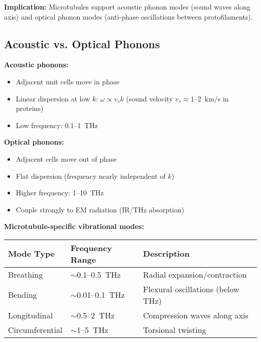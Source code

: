 \textbf{Implication:} Microtubules support acoustic phonon modes (sound waves along axis) and optical phonon modes (anti-phase oscillations between protofilaments).

\subsection{Acoustic vs. Optical Phonons}
\label{subsec:acoustic-optical}

\textbf{Acoustic phonons:}
\begin{itemize}
\item Adjacent unit cells move in phase
\item Linear dispersion at low $k$: $\omega \propto v_s k$ (sound velocity $v_s \approx 1$--2~km/s in proteins)
\item Low frequency: 0.1--1~THz
\end{itemize}

\textbf{Optical phonons:}
\begin{itemize}
\item Adjacent cells move out of phase
\item Flat dispersion (frequency nearly independent of $k$)
\item Higher frequency: 1--10~THz
\item Couple strongly to EM radiation (IR/THz absorption)
\end{itemize}

\textbf{Microtubule-specific vibrational modes:}
\begin{center}
\begin{tabular}{lll}
\toprule
\textbf{Mode Type} & \textbf{Frequency Range} & \textbf{Description} \\
\midrule
Breathing & $\sim$0.1--0.5~THz & Radial expansion/contraction \\
Bending & $\sim$0.01--0.1~THz & Flexural oscillations (below THz) \\
Longitudinal & $\sim$0.5--2~THz & Compression waves along axis \\
Circumferential & $\sim$1--5~THz & Torsional twisting \\
\bottomrule
\end{tabular}
\end{center}

